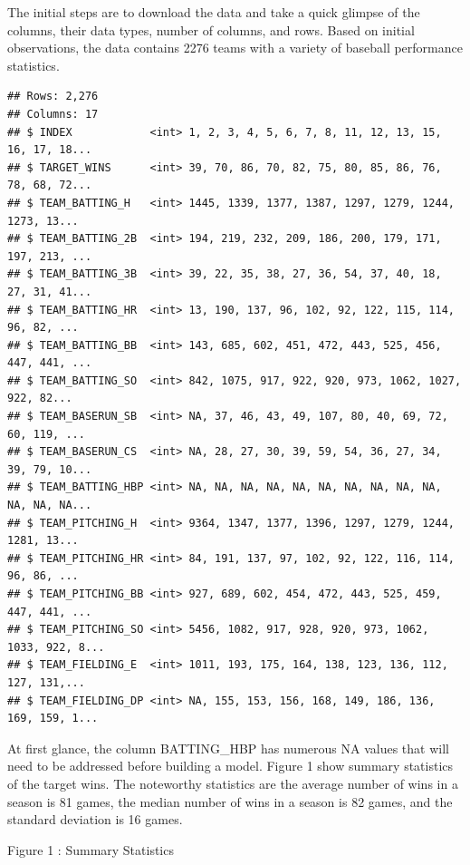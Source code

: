 \documentclass[
]{article}
\begin{document}
The initial steps are to download the data and take a quick glimpse of
the columns, their data types, number of columns, and rows. Based on
initial observations, the data contains 2276 teams with a variety of
baseball performance statistics.

\begin{verbatim}
## Rows: 2,276
## Columns: 17
## $ INDEX            <int> 1, 2, 3, 4, 5, 6, 7, 8, 11, 12, 13, 15, 16, 17, 18...
## $ TARGET_WINS      <int> 39, 70, 86, 70, 82, 75, 80, 85, 86, 76, 78, 68, 72...
## $ TEAM_BATTING_H   <int> 1445, 1339, 1377, 1387, 1297, 1279, 1244, 1273, 13...
## $ TEAM_BATTING_2B  <int> 194, 219, 232, 209, 186, 200, 179, 171, 197, 213, ...
## $ TEAM_BATTING_3B  <int> 39, 22, 35, 38, 27, 36, 54, 37, 40, 18, 27, 31, 41...
## $ TEAM_BATTING_HR  <int> 13, 190, 137, 96, 102, 92, 122, 115, 114, 96, 82, ...
## $ TEAM_BATTING_BB  <int> 143, 685, 602, 451, 472, 443, 525, 456, 447, 441, ...
## $ TEAM_BATTING_SO  <int> 842, 1075, 917, 922, 920, 973, 1062, 1027, 922, 82...
## $ TEAM_BASERUN_SB  <int> NA, 37, 46, 43, 49, 107, 80, 40, 69, 72, 60, 119, ...
## $ TEAM_BASERUN_CS  <int> NA, 28, 27, 30, 39, 59, 54, 36, 27, 34, 39, 79, 10...
## $ TEAM_BATTING_HBP <int> NA, NA, NA, NA, NA, NA, NA, NA, NA, NA, NA, NA, NA...
## $ TEAM_PITCHING_H  <int> 9364, 1347, 1377, 1396, 1297, 1279, 1244, 1281, 13...
## $ TEAM_PITCHING_HR <int> 84, 191, 137, 97, 102, 92, 122, 116, 114, 96, 86, ...
## $ TEAM_PITCHING_BB <int> 927, 689, 602, 454, 472, 443, 525, 459, 447, 441, ...
## $ TEAM_PITCHING_SO <int> 5456, 1082, 917, 928, 920, 973, 1062, 1033, 922, 8...
## $ TEAM_FIELDING_E  <int> 1011, 193, 175, 164, 138, 123, 136, 112, 127, 131,...
## $ TEAM_FIELDING_DP <int> NA, 155, 153, 156, 168, 149, 186, 136, 169, 159, 1...
\end{verbatim}

\newpage

At first glance, the column BATTING\_HBP has numerous NA values that
will need to be addressed before building a model. Figure 1 show summary
statistics of the target wins. The noteworthy statistics are the average
number of wins in a season is 81 games, the median number of wins in a
season is 82 games, and the standard deviation is 16 games.

\begin{center}
Figure 1 :  Summary Statistics
\end{center}
\end{document}
